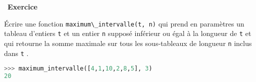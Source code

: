 \documentclass[
  10pt,
]{article}
\newcommand{\passthrough}[1]{#1}
\newcounter{exo}
\newenvironment{exercice}[1]
{\par \medskip   \addtocounter{exo}{1} \noindent  
\begin{bclogo}[arrondi =0.1,   noborder = true, logo=\bccrayon, marge=4]{~\textbf{Exercice} \textbf{\theexo} {\itshape #1} }  \par}
{
\end{bclogo}
 \par \bigskip }
\begin{document}
\begin{exercice}{}

Écrire une fonction \passthrough{\lstinline!maximum\_intervalle(t, n)!}
qui prend en paramètres un tableau d'entiers \passthrough{\lstinline!t!}
et un entier \passthrough{\lstinline!n!} supposé inférieur ou égal à la
longueur de \passthrough{\lstinline!t!} et qui retourne la somme
maximale sur tous les sous-tableaux de longueur
\passthrough{\lstinline!n!} inclus dans \passthrough{\lstinline!t!} .

\begin{lstlisting}[language=Python]
>>> maximum_intervalle([4,1,10,2,8,5], 3)
20
\end{lstlisting}

\end{exercice}
\end{document}
